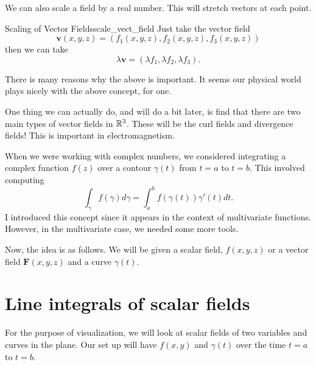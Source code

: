         We can also scale a field by a real number.  This will stretch vectors at each point.
        
        \begin{ex}{Scaling of Vector Fields}{scale_vect_field}
        Just take the vector field
        \[
        \mathbf{v}(x,y,z)=(f_1(x,y,z),f_2(x,y,z),f_3(x,y,z))
        \]
        then we can take
        \[
        \lambda \mathbf{v}=(\lambda f_1, \lambda f_2, \lambda f_3).
        \]
        \end{ex}
        
        \begin{remark}
        There is many reasons why the above is important.  It seems our physical world plays nicely with the above concept, for one.
        
        One thing we can actually do, and will do a bit later, is find that there are two main types of vector fields in $\mathbb{R}^3$.  These will be the curl fields and divergence fields!  This is important in electromagnetism.
        \end{remark}
        
        When we were working with complex numbers, we considered integrating a complex function $f(z)$ over a contour $\gamma(t)$ from $t=a$ to $t=b$.  This involved computing
        \[
        \int_\gamma f(\gamma)d\gamma = \int_a^b f(\gamma(t))\gamma'(t)dt.
        \]
        I introduced this concept since it appears in the context of multivariate functions.  However, in the multivariate case, we needed some more tools.
        
        Now, the idea is as follows.  We will be given a scalar field, $f(x,y,z)$ or a vector field $\mathbf{F}(x,y,z)$ and a curve $\gamma(t)$.  
        
        \section{Line integrals of scalar fields}
        For the purpose of visualization, we will look at scalar fields of two variables and curves in the plane.  Our set up will have $f(x,y)$ and $\gamma(t)$ over the time $t=a$ to $t=b$.
        

